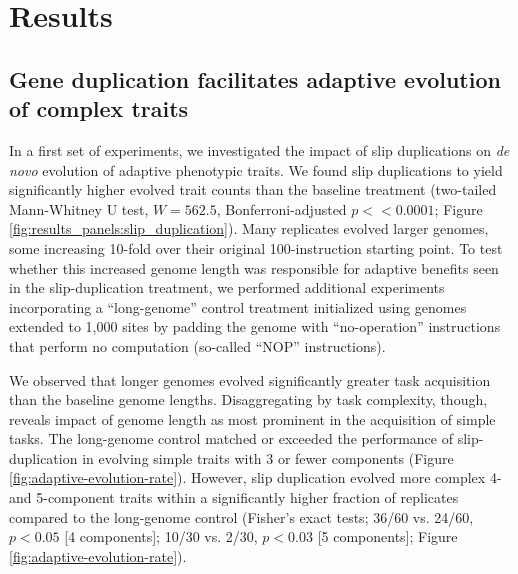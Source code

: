 \section{Results} \label{sec:results}

\subsection{Gene duplication facilitates adaptive evolution of complex traits}



In a first set of experiments, we investigated the impact of slip duplications on \textit{de novo} evolution of adaptive phenotypic traits.
We found slip duplications to yield significantly higher evolved trait counts than the baseline treatment (two-tailed Mann-Whitney U test, $W = 562.5$, Bonferroni-adjusted $p << 0.0001$; Figure \ref{fig:results_panels:slip_duplication}).
Many replicates evolved larger genomes, some increasing 10-fold over their original 100-instruction starting point.
To test whether this increased genome length was responsible for adaptive benefits seen in the slip-duplication treatment, we performed additional experiments incorporating a ``long-genome'' control treatment initialized using genomes extended to 1,000 sites by padding the genome with ``no-operation'' instructions that perform no computation (so-called ``NOP'' instructions).



We observed that longer genomes evolved significantly greater task acquisition than the baseline genome lengths.
Disaggregating by task complexity, though, reveals impact of genome length as most prominent in the acquisition of simple tasks.
The long-genome control matched or exceeded the performance of slip-duplication in evolving simple traits with 3 or fewer components (Figure \ref{fig:adaptive-evolution-rate}).
However, slip duplication evolved more complex 4- and 5-component traits within a significantly higher fraction of replicates compared to the long-genome control (Fisher's exact tests; 36/60 vs. 24/60, $p<0.05$ [4 components]; 10/30 vs. 2/30, $p<0.03$ [5 components]; Figure \ref{fig:adaptive-evolution-rate}).

